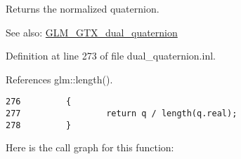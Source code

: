 Returns the normalized quaternion.

\begin{Desc}
\item[See also:]\hyperlink{group__gtc__dual__quaternion}{GLM\_\-GTX\_\-dual\_\-quaternion} \end{Desc}


Definition at line 273 of file dual\_\-quaternion.inl.

References glm::length().

\begin{Code}\begin{verbatim}276         {
277                 return q / length(q.real);
278         }
\end{verbatim}
\end{Code}




Here is the call graph for this function: